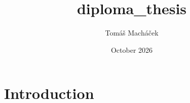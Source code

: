 \documentclass{article}
\title{diploma\_thesis}
\author{Tomáš Macháček}
\date{October 2026}
\begin{document}
\maketitle

\section{Introduction}
\end{document}

